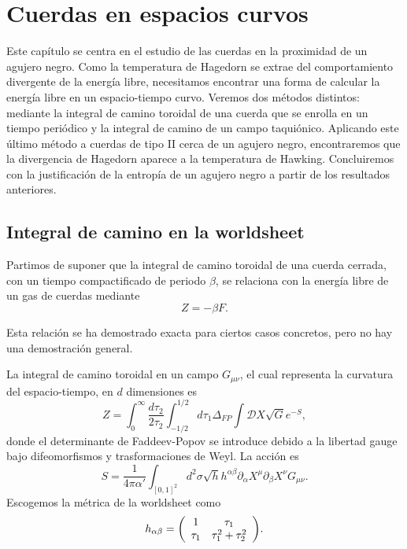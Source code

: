 \chapter{Cuerdas en espacios curvos}

Este capítulo se centra en el estudio de las cuerdas en la proximidad de un agujero negro.
Como  la temperatura de Hagedorn se extrae del comportamiento divergente de la energía libre, 
necesitamos encontrar una forma de calcular la energía libre en un espacio-tiempo curvo.
Veremos dos métodos distintos: mediante la integral de camino toroidal de una cuerda
que se enrolla en un tiempo periódico y la integral de camino de un campo taquiónico.
Aplicando este último método a cuerdas de tipo II cerca de un agujero negro, encontraremos que
la divergencia de Hagedorn aparece a la temperatura de Hawking.
Concluiremos con la justificación de la entropía de un agujero negro a partir de los resultados anteriores.

\section{Integral de camino en la worldsheet}

Partimos de suponer que la integral de camino toroidal de una cuerda cerrada, con
un tiempo compactificado de periodo $\beta$, se relaciona con la energía libre de un gas de cuerdas mediante
\begin{equation}
  Z =  -\beta F.
\end{equation}

Esta relación se ha demostrado exacta para ciertos casos concretos, pero no hay una demostración general.

La integral de camino toroidal en un campo $G_{\mu\nu}$, el cual representa la curvatura
del espacio-tiempo, en $d$ dimensiones es
\begin{equation}
  Z=\int_0^\infty \frac{d\tau_2}{2\tau_2} \int_{-1/2}^{1/2} d\tau_1 \Delta_{FP} \int \mathcal DX
  \sqrt G e^{-S},
  \label{eq:toruspi}
\end{equation}
donde el determinante de Faddeev-Popov se introduce debido a la libertad gauge bajo difeomorfismos
y trasformaciones de Weyl.
La acción es 
\begin{equation}
  S= \frac{1}{4\pi \alpha'}\int_{[0,1]^2} d^2\sigma \sqrt h h^{\alpha\beta} \partial_\alpha X^\mu\partial_\beta X^\nu G_{\mu\nu}.
\end{equation}
Escogemos la métrica de la worldsheet como
\begin{equation}
  h_{\alpha\beta} =
\qty(
\begin{array}{cc}
  1 & \tau_1 \\
  \tau_1 & \tau_1^2+\tau_2^2
\end{array}
).
\end{equation}

